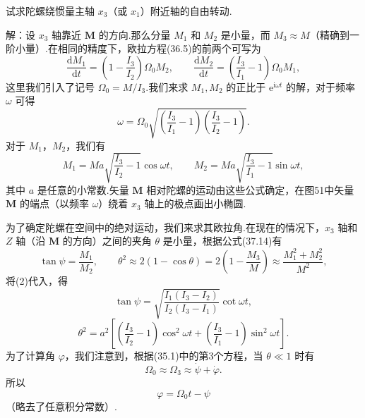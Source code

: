 \begin{xiti}

\quad 试求陀螺绕惯量主轴 $x_3$（或 $x_1$）附近轴的自由转动.

解：设 $x_3$ 轴靠近 $\boldsymbol{M}$ 的方向.那么分量 $M_1$ 和 $M_2$ 是小量，而 $M_3\approx M$（精确到一阶小量）.在相同的精度下，欧拉方程(36.5)的前两个可写为
\begin{equation*}
  \frac{\mathrm{d}M_1}{\mathrm{d}t}
  =\left(1-\frac{I_3}{I_2}\right)\Omega_0 M_2,\qquad
  \frac{\mathrm{d}M_2}{\mathrm{d}t}
  =\left(\frac{I_3}{I_1}-1\right)\Omega_0 M_1,
\end{equation*}
这里我们引入了记号 $\Omega_0=M/I_3$.我们来求 $M_1,M_2$ 的正比于 $\mathrm{e}^{\mathrm{i}\omega t}$ 的解，对于频率 $\omega$ 可得
\begin{equation*}
  \omega=\Omega_0\sqrt{\left(\frac{I_3}{I_1}-1\right)
  \left(\frac{I_3}{I_2}-1\right)}.
  \tag{1}
\end{equation*}
对于 $M_1$，$M_2$，我们有
\begin{equation*}
  M_1=Ma\sqrt{\frac{I_3}{I_2}-1}\cos\omega t,\qquad
  M_2=Ma\sqrt{\frac{I_3}{I_1}-1}\sin\omega t,
  \tag{2}
\end{equation*}
其中 $a$ 是任意的小常数.矢量 $\boldsymbol{M}$ 相对陀螺的运动由这些公式确定，在图51中矢量 $\boldsymbol{M}$ 的端点（以频率 $\omega$）绕着 $x_3$ 轴上的极点画出小椭圆.

为了确定陀螺在空间中的绝对运动，我们来求其欧拉角.在现在的情况下，$x_3$ 轴和 $Z$ 轴（沿 $\boldsymbol{M}$ 的方向）之间的夹角 $\theta$ 是小量，根据公式(37.14)有
\begin{equation*}
  \tan\psi=\frac{M_1}{M_2},\qquad
  \theta^2\approx2(1-\cos\theta)
  =2\left(1-\frac{M_3}{M}\right)
  \approx\frac{M_1^2+M_2^2}{M^2},
\end{equation*}
将(2)代入，得
\begin{equation*}
  \tan\psi=\sqrt{\frac{I_1(I_3-I_2)}{I_2(I_3-I_1)}}\cot\omega t,
\end{equation*}
\begin{equation*}
  \theta^2=a^2\left[\left(\frac{I_3}{I_2}-1\right)\cos^2\omega t
  +\left(\frac{I_3}{I_1}-1\right)\sin^2\omega t\right].
  \tag{3}
\end{equation*}
为了计算角 $\varphi$，我们注意到，根据(35.1)中的第3个方程，当 $\theta\ll1$ 时有
\begin{equation*}
  \Omega_0\approx\Omega_3\approx\dot{\psi}+\dot{\varphi}.
\end{equation*}
所以
\begin{equation*}
  \varphi=\Omega_0 t-\psi
\end{equation*}
（略去了任意积分常数）.


\end{xiti}
